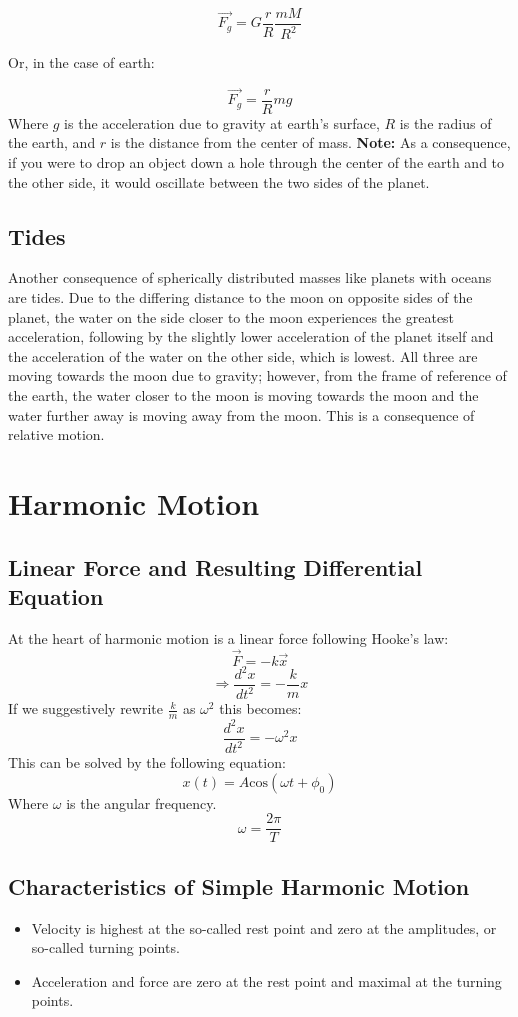 \documentclass{article}
\begin{document}
$$\vec{F_g}=G\frac{r}{R}\frac{mM}{R^2}$$

Or, in the case of earth:

$$\vec{F_g}=\frac{r}{R}mg$$
Where $g$ is the acceleration due to gravity at earth's surface, $R$ is the radius of the earth, and $r$ is the distance from the center of mass. \textbf{Note:} As a consequence, if you were to drop an object down a hole through the center of the earth and to the other side, it would oscillate between the two sides of the planet.

\subsection{Tides} Another consequence of spherically distributed masses like planets with oceans are tides. Due to the differing distance to the moon on opposite sides of the planet, the water on the side closer to the moon experiences the greatest acceleration, following by the slightly lower acceleration of the planet itself and the acceleration of the water on the other side, which is lowest. All three are moving towards the moon due to gravity; however, from the frame of reference of the earth, the water closer to the moon is moving towards the moon and the water further away is moving away from the moon. This is a consequence of relative motion.

\pagebreak
\section{Harmonic Motion}
\subsection{Linear Force and Resulting Differential Equation}
At the heart of harmonic motion is a linear force following Hooke's law:
$$\vec{F}=-k\vec{x}$$
$$\Rightarrow \frac{d^2 x}{dt^2}=-\frac{k}{m} x$$
If we suggestively rewrite $\frac{k}{m}$ as $\omega^2$ this becomes:
$$\frac{d^2 x}{dt^2}=-\omega^2 x$$
This can be solved by the following equation:
$$x(t)=A\text{cos}(\omega t + \phi_0)$$
Where $\omega$ is the angular frequency. 
$$\omega=\frac{2\pi}{T}$$
\subsection{Characteristics of Simple Harmonic Motion} 
\begin{itemize}
    \item Velocity is highest at the so-called rest point and zero at the amplitudes, or so-called turning points.
    \item Acceleration and force are zero at the rest point and maximal at the turning points.
\end{itemize}
\end{document}
